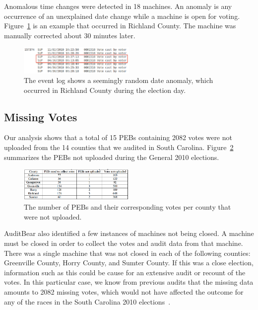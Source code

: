 \documentclass[letterpaper,twocolumn,10pt]{article}
\begin{document}
Anomalous time changes were detected in 18 machines. An anomaly is any
occurrence of an unexplained date change while a machine is open for
voting. Figure~\ref{fig:date-anomaly} is an example that occurred in Richland
County. The machine was manually corrected about 30 minutes later.  

\begin{figure}[htbp]
\begin{center}
    \includegraphics[width=0.5\textwidth,height=0.1\textheight]{DateAnomaly.eps}
\end{center}
\caption{The event log shows a seemingly random date anomaly, which occurred in Richland County during the election day.}
\label{fig:date-anomaly}
\end{figure}

\subsection{Missing Votes}
Our analysis shows that a total of 15 PEBs containing 2082 votes were not
uploaded from the 14 counties that we audited in South
Carolina. Figure~\ref{fig:pebs-not-uploaded} summarizes the PEBs not uploaded
during the General 2010 elections.  

\begin{figure}[htbp]
\begin{center}
    \includegraphics[width=0.5\textwidth,height=0.1\textheight]{PEBsNotUploaded1.eps}
\end{center}
\caption{The number of PEBs and their corresponding votes per county that were not uploaded.}
\label{fig:pebs-not-uploaded}
\end{figure}

AuditBear also identified a few instances of machines not being closed. A
machine must be closed in order to collect the votes and audit data from that
machine. There was a single machine that was not closed in each of the following
counties: Greenville County, Horry County, and Sumter County.  If this was a close election, information such as this could be cause for an extensive audit or recount of the votes. In this particular case, we know from previous audits that the missing data amounts to 2082 missing votes, which would not have affected the outcome for any of the races in the South Carolina 2010 elections~\cite{scresults}. 
\end{document}
